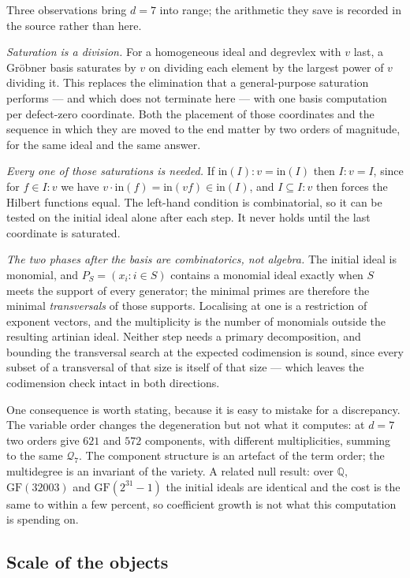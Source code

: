 \documentclass[11pt,a4paper]{article}
\newcommand{\Qd}{\mathcal{Q}}
\theoremstyle{plain}
\theoremstyle{definition}
\theoremstyle{remark}
\begin{document}
Three observations bring $d = 7$ into range; the arithmetic they save is recorded in the source
rather than here.

\emph{Saturation is a division.} For a homogeneous ideal and degrevlex with $v$ last, a Gr\"obner
basis saturates by $v$ on dividing each element by the largest power of $v$ dividing it. This
replaces the elimination that a general-purpose saturation performs --- and which does not
terminate here --- with one basis computation per defect-zero coordinate. Both the placement of
those coordinates and the sequence in which they are moved to the end matter by two orders of
magnitude, for the same ideal and the same answer.

\emph{Every one of those saturations is needed.} If $\mathrm{in}(I) : v = \mathrm{in}(I)$ then
$I : v = I$, since for $f \in I : v$ we have $v \cdot \mathrm{in}(f) = \mathrm{in}(vf) \in
\mathrm{in}(I)$, and $I \subseteq I : v$ then forces the Hilbert functions equal. The left-hand
condition is combinatorial, so it can be tested on the initial ideal alone after each step. It
never holds until the last coordinate is saturated.

\emph{The two phases after the basis are combinatorics, not algebra.} The initial ideal is
monomial, and $P_S = (x_i : i \in S)$ contains a monomial ideal exactly when $S$ meets the support
of every generator; the minimal primes are therefore the minimal \emph{transversals} of those
supports. Localising at one is a restriction of exponent vectors, and the multiplicity is the
number of monomials outside the resulting artinian ideal. Neither step needs a primary
decomposition, and bounding the transversal search at the expected codimension is sound, since
every subset of a transversal of that size is itself of that size --- which leaves the codimension
check intact in both directions.

One consequence is worth stating, because it is easy to mistake for a discrepancy. The variable
order changes the degeneration but not what it computes: at $d = 7$ two orders give $621$ and $572$
components, with different multiplicities, summing to the same $\Qd_7$. The component structure is
an artefact of the term order; the multidegree is an invariant of the variety. A related null
result: over $\mathbb{Q}$, $\mathrm{GF}(32003)$ and $\mathrm{GF}(2^{31}-1)$ the initial ideals are
identical and the cost is the same to within a few percent, so coefficient growth is not what this
computation is spending on.

\subsection{Scale of the objects}
\end{document}
